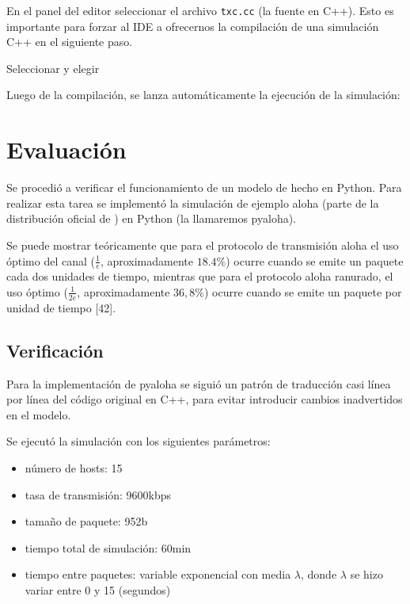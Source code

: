 \documentclass[]{article}
\begin{document}
En el panel del editor seleccionar el archivo \verb!txc.cc! (la fuente en C++).
Esto es importante para forzar al IDE a ofrecernos la compilación de una
simulación C++ en el siguiente paso.

Seleccionar  y elegir 


Luego de la compilación, se lanza automáticamente la ejecución de la
simulación:


\section{Evaluación}\label{sec:ev}

Se procedió a verificar el funcionamiento de un modelo de \omnetpp{} hecho en
Python. Para realizar esta tarea se implementó la simulación de ejemplo aloha
(parte de la distribución oficial de \omnetpp{}) en Python (la llamaremos
pyaloha).

Se puede mostrar teóricamente que para el protocolo de transmisión aloha el uso óptimo del
canal ($\frac{1}{e}$, aproximadamente $18.4\%$) ocurre cuando se emite un paquete cada dos
unidades de tiempo, mientras que para el protocolo aloha ranurado, el uso
óptimo ($\frac{1}{2e}$, aproximadamente $36,8\%$) ocurre cuando se emite un paquete por
unidad de tiempo [42].

\subsection{Verificación}

Para la implementación de pyaloha se siguió un patrón de traducción casi línea
por línea del código original en C++, para evitar introducir cambios
inadvertidos en el modelo.

Se ejecutó la simulación con los siguientes parámetros:

\begin{itemize}
    \item número de hosts: 15

    \item tasa de transmisión: 9600kbps

    \item tamaño de paquete: 952b

    \item tiempo total de simulación: 60min

    \item tiempo entre paquetes: variable exponencial con media $\lambda$,
donde $\lambda$ se hizo variar entre 0 y 15 (segundos)
\end{itemize}
\end{document}

